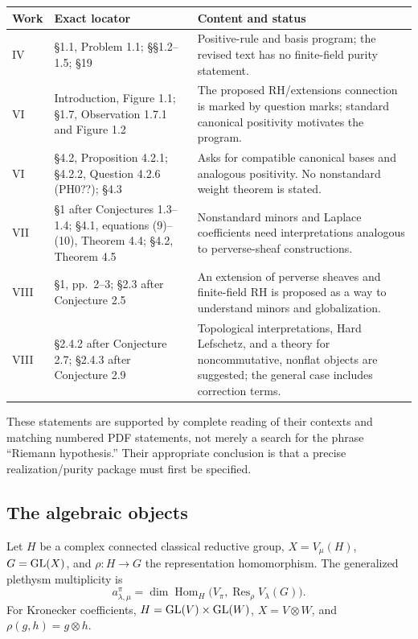 \documentclass[11pt,a4paper]{article}
\newcommand{\Hom}{\operatorname{Hom}}\newcommand{\Spec}{\operatorname{Spec}}\newcommand{\Tr}{\operatorname{Tr}}\newcommand{\rank}{\operatorname{rank}}\newcommand{\Sym}{\operatorname{Sym}}\newcommand{\Res}{\operatorname{Res}}\newcommand{\IC}{\operatorname{IC}}\newcommand{\Gr}{\operatorname{Gr}}\newcommand{\Rep}{\operatorname{Rep}}\newcommand{\Frob}{\operatorname{Frob}}\newcommand{\End}{\operatorname{End}}
\theoremstyle{named}\newtheorem{finding}{Finding}[section]
\theoremstyle{definition}\newtheorem{definition}[finding]{Definition}
\theoremstyle{remark}\newtheorem{remark}[finding]{Remark}
\begin{document}
{\small\begin{longtable}{p{.13\linewidth}p{.35\linewidth}p{.44\linewidth}}
\toprule Work&Exact locator&Content and status\\\midrule\endhead
IV&\S1.1, Problem 1.1; \S\S1.2--1.5; \S19&Positive-rule and basis program; the revised text has no finite-field purity statement.\\
VI&Introduction, Figure 1.1; \S1.7, Observation 1.7.1 and Figure 1.2&The proposed RH/extensions connection is marked by question marks; standard canonical positivity motivates the program.\\
VI&\S4.2, Proposition 4.2.1; \S4.2.2, Question 4.2.6 (PH0??); \S4.3&Asks for compatible canonical bases and analogous positivity. No nonstandard weight theorem is stated.\\
VII&\S1 after Conjectures 1.3--1.4; \S4.1, equations (9)--(10), Theorem 4.4; \S4.2, Theorem 4.5&Nonstandard minors and Laplace coefficients need interpretations analogous to perverse-sheaf constructions.\\
VIII&\S1, pp.~2--3; \S2.3 after Conjecture 2.5&An extension of perverse sheaves and finite-field RH is proposed as a way to understand minors and globalization.\\
VIII&\S2.4.2 after Conjecture 2.7; \S2.4.3 after Conjecture 2.9&Topological interpretations, Hard Lefschetz, and a theory for noncommutative, nonflat objects are suggested; the general case includes correction terms.\\\bottomrule
\end{longtable}}
These statements are supported by complete reading of their contexts and matching numbered PDF statements, not merely a search for the phrase ``Riemann hypothesis.'' Their appropriate conclusion is that a precise realization/purity package must first be specified.

\subsection{The algebraic objects}
Let $H$ be a complex connected classical reductive group, $X=V_\mu(H)$, $G=\mathrm{GL}(X)$, and $\rho:H\to G$ the representation homomorphism. The generalized plethysm multiplicity is
\begin{equation}\label{eq:plethysm}
a_{\lambda,\mu}^{\pi}=\dim\Hom_H\bigl(V_\pi,\Res_\rho V_\lambda(G)\bigr).
\end{equation}
For Kronecker coefficients, $H=\mathrm{GL}(V)\times\mathrm{GL}(W)$, $X=V\otimes W$, and $\rho(g,h)=g\otimes h$.
\end{document}
